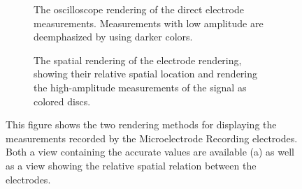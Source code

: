 \begin{figure}
\centering
    \begin{subfigure}[b]{0.49\textwidth}
        \caption{The  oscilloscope rendering of the direct electrode measurements. Measurements with low amplitude are deemphasized by using darker colors.}
        \label{contributions:dbs:sound:2d}
    \end{subfigure}
    \hfill
    \begin{subfigure}[b]{0.49\textwidth}
        \caption{The spatial  rendering of the electrode rendering, showing their relative spatial location and rendering the high-amplitude measurements of the signal as colored discs.}
        \label{contributions:dbs:sound:3d}
    \end{subfigure}
    \caption{This figure shows the two rendering methods for displaying the measurements recorded by the Microelectrode Recording electrodes. Both a view containing the accurate values are available (a) as well as a view showing the relative spatial relation between the electrodes.}
    \label{contributions:dbs:sound}
\end{figure}

